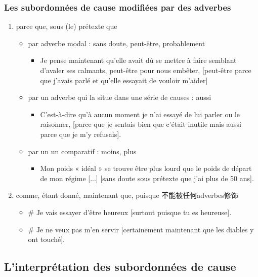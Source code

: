 \documentclass[UTF8]{report}
\begin{document}
\subsubsection{Les subordonnées de cause modifiées par des adverbes}
\begin{enumerate}
    \item parce que, sous (le) prétexte que
    \begin{itemize}
        \item par adverbe modal : sans doute, peut-être, probablement
        \begin{itemize}
            \item Je pense maintenant qu’elle avait dû se mettre à faire semblant d’avaler ses calmants, peut-être pour nous embêter, [peut-être parce que j’avais parlé et qu’elle essayait de vouloir m’aider]
        \end{itemize}
        \item par un adverbe qui la situe dans une série de causes : aussi
        \begin{itemize}
            \item C’est-à-dire qu’à aucun moment je n’ai essayé de lui parler ou le raisonner, [parce que je sentais bien que c’était inutile mais aussi parce que je m’y refusais]. 
        \end{itemize}
        \item par un un comparatif : moins, plus
        \begin{itemize}
            \item Mon poids « idéal » se trouve être plus lourd que le poids de départ de mon régime [...] [sans doute sous prétexte que j’ai plus de 50 ans].
        \end{itemize}
    \end{itemize}
    \item comme, étant donné, maintenant que, puisque 不能被任何adverbes修饰
    \begin{itemize}
        \item \# Je vais essayer d’être heureux [surtout puisque tu es heureuse].
        \item \# Je ne veux pas m’en servir [certainement maintenant que les diables y ont touché].
    \end{itemize}
\end{enumerate}



\subsection{L’interprétation des subordonnées de cause}
\end{document}
